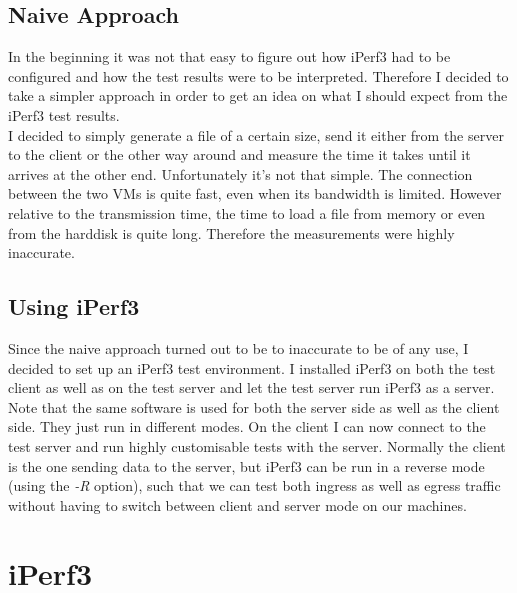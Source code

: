 \subsection{Naive Approach}
In the beginning it was not that easy to figure out how iPerf3 had to be configured and how the test results were to be interpreted. Therefore I decided to take a simpler approach in order to get an idea on what I should expect from the iPerf3 test results. 
\\
I decided to simply generate a file of a certain size, send it either from the server to the client or the other way around and measure the time it takes until it arrives at the other end. Unfortunately it's not that simple. The connection between the two \acsp{VM} is quite fast, even when its bandwidth is limited. However relative to the transmission time, the time to load a file from memory or even from the harddisk is quite long. Therefore the measurements were highly inaccurate.

\subsection{Using iPerf3}

Since the naive approach turned out to be to inaccurate to be of any use, I decided to set up an iPerf3 test environment. I installed iPerf3 on both the test client as well as on the test server and let the test server run iPerf3 as a server. Note that the same software is used for both the server side as well as the client side. They just run in different modes. On the client I can now connect to the test server and run highly customisable tests with the server. Normally the client is the one sending data to the server, but iPerf3 can be run in a reverse mode (using the \textit{-R} option), such that we can test both ingress as well as egress traffic without having to switch between client and server mode on our machines.

\section{iPerf3}

